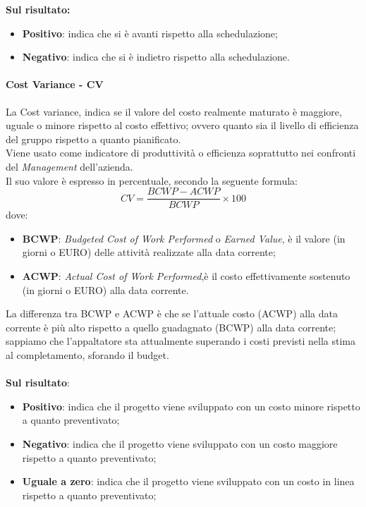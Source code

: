 		{\bfseries Sul risultato:}
		\begin{itemize}
		\item {\bfseries Positivo}: indica che si è avanti rispetto alla schedulazione;
		\item {\bfseries Negativo}: indica che si è indietro rispetto alla schedulazione.\\
		\end{itemize}
	 \paragraph{Cost Variance - CV}
	 La Cost variance, indica se il valore del costo realmente maturato è maggiore, uguale o minore rispetto al costo effettivo; ovvero quanto sia il livello di efficienza del gruppo rispetto a quanto pianificato. \\
	 Viene usato come indicatore di produttività o efficienza soprattutto nei confronti del {\itshape Management} dell'azienda. \\
	 Il suo valore è espresso in percentuale, secondo la seguente formula:
	 \begin{displaymath}
	 	CV = \frac{BCWP - ACWP}{BCWP}\times100
	 \end{displaymath}
 		dove:
 		\begin{itemize}
 			\item {\bfseries BCWP}: {\itshape Budgeted Cost of Work Performed} o {\itshape
 				Earned Value}, è il valore (in giorni o EURO) delle attività realizzate alla data corrente;
 			\item {\bfseries ACWP}: {\itshape Actual Cost of Work Performed},è il costo effettivamente sostenuto (in giorni o EURO) alla data corrente.
 		\end{itemize}
 		La differenza tra BCWP e ACWP è che se l'attuale costo (ACWP) alla data corrente è più alto rispetto a quello guadagnato (BCWP) alla data corrente; sappiamo che l'appaltatore sta attualmente superando i costi previsti nella stima al completamento, sforando il budget.
 		\\ \\
 		{\bfseries Sul risultato}:
 		\begin{itemize}
 			\item {\bfseries Positivo}: indica che il progetto viene sviluppato con un costo minore rispetto a quanto preventivato;
 			\item {\bfseries Negativo}:  indica che il progetto viene sviluppato con un costo maggiore rispetto a quanto preventivato;
 			\item {\bfseries Uguale a zero}: indica che il progetto viene sviluppato con un costo in linea rispetto a quanto preventivato;
 		\end{itemize} 
	
